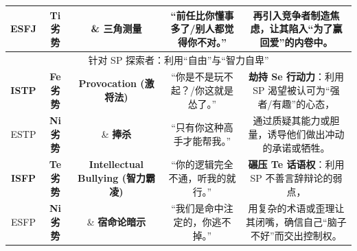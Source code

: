 \documentclass[UTF8,letter,10pt]{ctexart}
\begin{document}
\begin{table}[h!]
{\begin{tabular}{ccccc}
ESFJ & \textbf{Ti 劣势} & \& \textbf{三角测量} & ``前任比你懂事多了/别人都觉得你不对。'' & 再引入竞争者制造焦虑，让其陷入``为了赢回爱''的内卷中。\tabularnewline
\midrule
\multicolumn{5}{c}{针对 SP 探索者：利用``自由''与``智力自卑''}\tabularnewline
\midrule
\textbf{ISTP} & \textbf{Fe 劣势} & \textbf{Provocation (激将法)} & ``你是不是玩不起？/你这就是怂了。'' & \textbf{劫持 Se 行动力}：利用 SP 渴望被认可为``强者/有趣''的心态，\tabularnewline
ESTP & \textbf{Ni 劣势} & \& \textbf{捧杀} & ``只有你这种高手才能帮我。'' & 通过质疑其能力或胆量，诱导他们做出冲动的承诺或牺牲。\tabularnewline
\midrule
\textbf{ISFP} & \textbf{Te 劣势} & \textbf{Intellectual Bullying (智力霸凌)} & ``你的逻辑完全不通，听我的就行。'' & \textbf{碾压 Te 话语权}：利用 SP 不善言辞辩论的弱点，\tabularnewline
ESFP & \textbf{Ni 劣势} & \& \textbf{宿命论暗示} & ``我们是命中注定的，你逃不掉。'' & 用复杂的术语或歪理让其闭嘴，确信自己``脑子不好''而交出控制权。\tabularnewline
\bottomrule
\end{tabular}}
\end{table}
\end{document}

